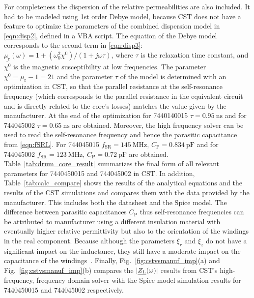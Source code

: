 For completeness the dispersion of the relative permeabilities are also included. It had to be modeled using 1st order Debye model, because CST does not have a feature to optimize the parameters of the combined dispersion model in \eqref{eqn:disp2}, defined in a VBA script. The equation of the Debye model corresponds to the second term in \eqref{eqn:disp3}: $\underline{\mu_\mathrm{r}}(\omega)= 1+(\omega_\mathrm{0}^2\chi^0)/(1+j\omega\tau)$, where $\tau$ is the relaxation time constant, and $\chi^0$ is the magnetic susceptibility at low frequencies. The parameter $\chi^0 = \mu_\mathrm{r}-1 = 21$ and the parameter $\tau$ of the model is determined with an optimization in CST, so that the parallel resistance at the self-resonance frequency (which corresponds to the parallel resistance in the equivalent circuit and is directly related to the core's losses) matches the value given by the manufacturer. At the end of the optimization for 7440140015 $\tau = \SI{0.95}{\nano\second}$ and for 744045002 $\tau = \SI{0.65}{\nano\second}$ are obtained. Moreover, the high frequency solver can be used to read the self-resonance frequency and hence the parasitic capacitance from \eqref{eqn:fSRL}. For 744045015 $f_\mathrm{SR} = \SI{145}{\mega\hertz}$, $C_\mathrm{P} = \SI{0.834}{\pico\farad}$ and for 744045002 $f_\mathrm{SR} = \SI{123}{\mega\hertz}$, $C_\mathrm{P} = \SI{0.72}{\pico\farad}$ are obtained. Table~\ref{tab:drum_core_result} summarizes the final form of all relevant parameters for 7440450015 and 744045002 in CST. In addition, Table~\ref{tab:calc_compare} shows the results of the analytical equations and the results of the CST simulations and compares them  with the data provided by the manufacturer. This includes both the datasheet and the Spice model. The difference between parasitic capacitances $C_\mathrm{P}$ thus self-resonance frequencies can be attributed to manufacturer using a different insulation material with eventually higher relative permittivity but also to the orientation of the windings in the real component. Because although the parameters $\xi_r$ and $\xi_z$ do not have a significant impact on the inductance, they still have a moderate impact on the capacitance of the windings~\cite{6732932}. Finally, Fig.~\ref{fig:cstvsmanuf_imp}(a) and Fig.~\ref{fig:cstvsmanuf_imp}(b) compares the $\lvert\underline{Z_\mathrm{L}}(\omega)\rvert$ results from CST's high-frequency, frequency domain solver with the Spice model simulation results for 7440450015 and 744045002 respectively.
